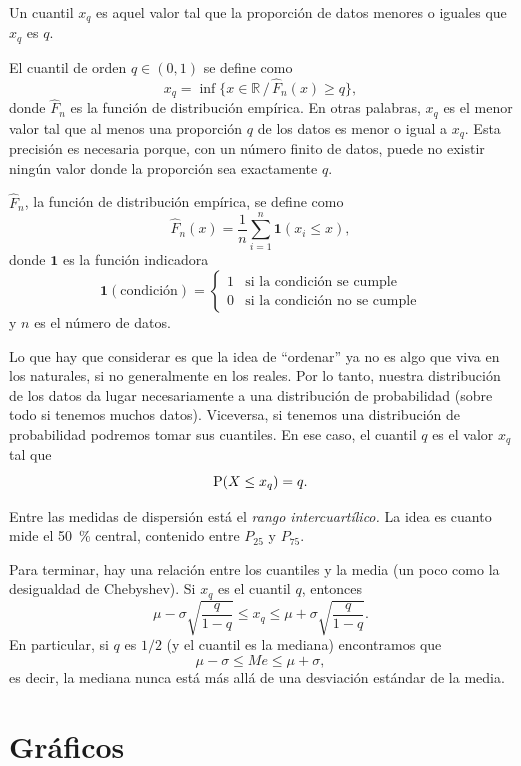 Un cuantil \(x_q\) es aquel valor tal que la proporción de datos menores o iguales que \(x_q\) es \(q\).

\formal

El cuantil de orden $q \in (0,1)$ se define como
\[
  x_q = \inf\{x \in \mathbb{R}\,/\,\hat{F}_n(x) \geq q\},
\]
donde $\hat{F}_n$ es la función de distribución empírica. En otras 
palabras, $x_q$ es el menor valor tal que al menos una proporción 
$q$ de los datos es menor o igual a $x_q$. Esta precisión es 
necesaria porque, con un número finito de datos, puede no existir 
ningún valor donde la proporción sea exactamente $q$. 

$\hat{F}_n$, la función de distribución empírica, se define como
\[
  \hat{F}_n(x) = \frac{1}{n}\sum_{i=1}^{n} \mathbf{1}(x_i \leq x),
\]
donde $\mathbf{1}$ es la función indicadora \[\mathbf{1}(\text{condición}) = \begin{cases} 1 & \text{si la condición se cumple} \\ 0 & \text{si la condición no se cumple} \end{cases}\] y $n$ es el número de datos.

\informal

Lo que hay que considerar es que la idea de \enquote{ordenar} ya no es algo que viva en los naturales, si no generalmente en los reales. Por lo tanto, nuestra distribución de los datos da lugar necesariamente a una distribución de probabilidad (sobre todo si tenemos muchos datos). Viceversa, si tenemos una distribución de probabilidad podremos tomar sus cuantiles. En ese caso, el cuantil \(q\) es el valor \(x_q\) tal que \[\operatorname{P}(X\leq x_q) = q.\]

Entre las medidas de dispersión está el \emph{rango intercuartílico.} La idea es cuanto mide el \qty{50}{\percent} central, contenido entre \(P_{25}\) y \(P_{75}\).

Para terminar, hay una relación entre los cuantiles y la media (un poco como la desigualdad de Chebyshev). Si \(x_q\) es el cuantil \(q\), entonces \[\mu-\sigma\sqrt{\frac{q}{1-q}} \leq x_q \leq \mu+\sigma\sqrt{\frac{q}{1-q}}.\] En particular, si \(q\) es \(1/2\) (y el cuantil es la mediana) encontramos que \[\mu-\sigma \leq Me \leq \mu + \sigma,\] es decir, la mediana nunca está más allá de una desviación estándar de la media.

\section{Gráficos}

